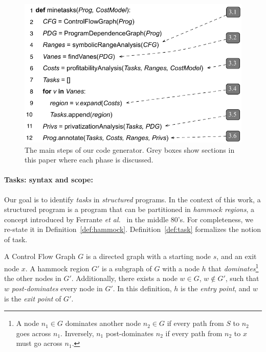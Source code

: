 \documentclass[sigplan,10pt,review,anonymous]{acmart}
\begin{document}
\begin{figure}[b]
\begin{center}
\includegraphics[width=1\columnwidth]{images/alg_main}
\caption{The main steps of our code generator.
Grey boxes show sections in this paper where each phase is discussed.}
\label{fig:alg_main}
\end{center}
\end{figure}

\paragraph{Tasks: syntax and scope:}
Our goal is to identify {\em tasks} in {\em structured} programs.
In the context of this work, a structured program is a program that can be
partitioned in {\em hammock regions}, a concept introduced by Ferrante
{\em et al.}~\cite{Ferrante87} in the middle 80's.
For completeness, we re-state it in Definition~\ref{def:hammock}.
Definition~\ref{def:task} formalizes the notion of task.

\begin{definition}
\label{def:hammock}
A Control Flow Graph $G$ is a directed graph with a starting node $s$, and an
exit node $x$.
A hammock region $G'$ is a subgraph of $G$ with a node $h$ that
{\em dominates}\footnote{A node $n_1 \in G$ dominates another node
$n_2 \in G$ if every path from  $S$ to $n_2$ goes across $n_1$.
Inversely, $n_1$ post-dominates $n_2$ if every path from $n_2$ to $x$ must
go across $n_1$.} the other nodes in $G'$.
Additionally, there exists a node $w \in G$, $w \notin G'$, such that
$w$ {\em post-dominates} every node in $G'$.
In this definition, $h$ is the {\em entry point}, and $w$ is the {\em exit point}
of $G'$.
\end{definition}
\end{document}
